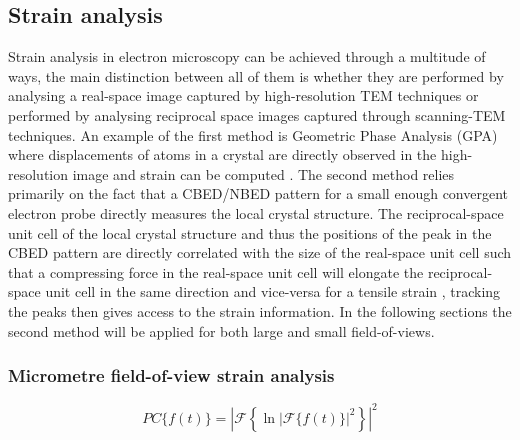 \subsection{Strain analysis}%
%
Strain analysis in electron microscopy can be achieved through a multitude of ways, the main distinction between all of them is whether they are performed by analysing a real-space image captured by high-resolution TEM techniques or performed by analysing reciprocal space images captured through scanning-TEM techniques. 
%
An example of the first method is Geometric Phase Analysis (GPA) where displacements of atoms in a crystal are directly observed in the high-resolution image and strain can be computed \cite{HYTCH1998131, hytchGEOMETRICPHASEANALYSIS1997, nguyenAtomicDefectsDoping2017}. 
%
The second method relies primarily on the fact that a CBED/NBED pattern for a small enough convergent electron probe directly measures the local crystal structure. 
%
The reciprocal-space unit cell of the local crystal structure and thus the positions of the peak in the CBED pattern are directly correlated with the size of the real-space unit cell such that a compressing force in the real-space unit cell will elongate the reciprocal-space unit cell in the same direction and vice-versa for a tensile strain \cite{ophusFourDimensionalScanningTransmission2019, vanwinkleRotationalDilationalReconstruction2023, kazmierczakStrainFieldsTwisted2021, hanStrainMappingTwoDimensional2018}, tracking the peaks then gives access to the strain information.  In the following sections the second method will be applied for both large and small field-of-views.

\subsubsection{Micrometre field-of-view strain analysis}
%
\begin{equation}
	PC\{f(t)\} = \left| \mathscr{F} \left\{ \ln{\left| \mathscr{F}\{f(t)\} \right|^2} \right\} \right|^2
	\label{eq:cepstrum}
\end{equation}

